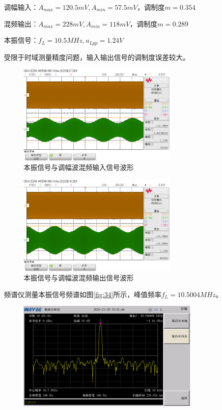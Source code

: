 \documentclass[UTF8]{ctexart}
\begin{document}
\begin{enumerate}
    调幅输入：$A_{max}=120.5mV,A_{min}=57.5mV$，调制度$m=0.354$

    混频输出：$A_{max}=228mV,A_{min}=118mV$，调制度$m=0.289$

    本振信号：$f_L=10.5MHz,u_{Lpp}=1.24V$

    受限于时域测量精度问题，输入输出信号的调制度误差较大。
    \begin{figure}[H]
        \centering
        \includegraphics[width=0.7\textwidth]{pics/32.png}

        \caption{本振信号与调幅波混频输入信号波形}\label{fig:32}
    \end{figure}
    \vspace{-1em}
    \begin{figure}[H]
        \centering
        \includegraphics[width=0.7\textwidth]{pics/33.png}

        \caption{本振信号与调幅波混频输出信号波形}\label{fig:33}
    \end{figure}
    \vspace{-1em}

    频谱仪测量本振信号频谱如图\ref{fig:34}所示，峰值频率$f_L=10.5004MHz$。
    \begin{figure}[H]
        \centering
        \includegraphics[width=0.8\textwidth]{pics/34.png}


\end{figure}
\end{enumerate}
\end{document}
